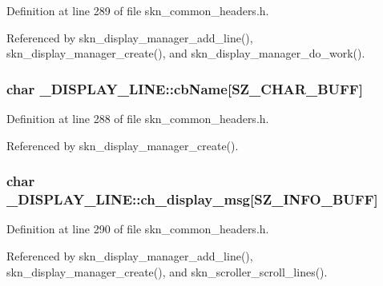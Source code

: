 Definition at line 289 of file skn\+\_\+common\+\_\+headers.\+h.



Referenced by skn\+\_\+display\+\_\+manager\+\_\+add\+\_\+line(), skn\+\_\+display\+\_\+manager\+\_\+create(), and skn\+\_\+display\+\_\+manager\+\_\+do\+\_\+work().

\hypertarget{struct___d_i_s_p_l_a_y___l_i_n_e_a3a374d209578adb1d4cea933756fb14a}{
\subsubsection[{cb\+Name}]{\setlength{\rightskip}{0pt plus 5cm}char \+\_\+\+D\+I\+S\+P\+L\+A\+Y\+\_\+\+L\+I\+N\+E\+::cb\+Name\mbox{[}{\bf S\+Z\+\_\+\+C\+H\+A\+R\+\_\+\+B\+U\+F\+F}\mbox{]}}}\label{struct___d_i_s_p_l_a_y___l_i_n_e_a3a374d209578adb1d4cea933756fb14a}


Definition at line 288 of file skn\+\_\+common\+\_\+headers.\+h.



Referenced by skn\+\_\+display\+\_\+manager\+\_\+create().

\hypertarget{struct___d_i_s_p_l_a_y___l_i_n_e_ae5fae9b599281d1d3f619b6e402e7c2c}{
\subsubsection[{ch\+\_\+display\+\_\+msg}]{\setlength{\rightskip}{0pt plus 5cm}char \+\_\+\+D\+I\+S\+P\+L\+A\+Y\+\_\+\+L\+I\+N\+E\+::ch\+\_\+display\+\_\+msg\mbox{[}{\bf S\+Z\+\_\+\+I\+N\+F\+O\+\_\+\+B\+U\+F\+F}\mbox{]}}}\label{struct___d_i_s_p_l_a_y___l_i_n_e_ae5fae9b599281d1d3f619b6e402e7c2c}


Definition at line 290 of file skn\+\_\+common\+\_\+headers.\+h.



Referenced by skn\+\_\+display\+\_\+manager\+\_\+add\+\_\+line(), skn\+\_\+display\+\_\+manager\+\_\+create(), and skn\+\_\+scroller\+\_\+scroll\+\_\+lines().

